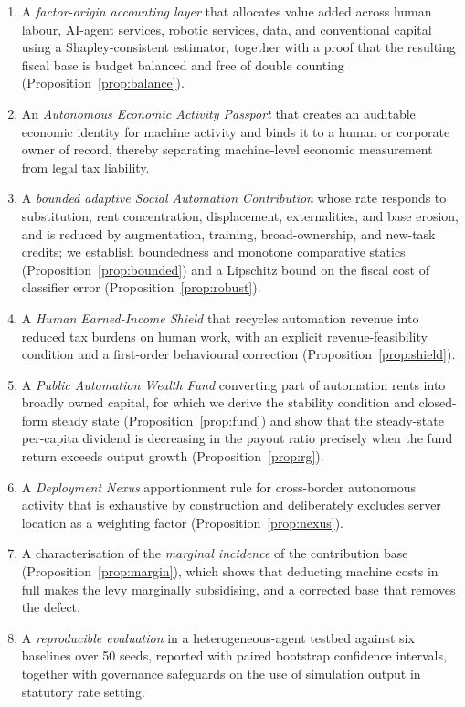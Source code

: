 \documentclass[journal]{IEEEtran}
\theoremstyle{plain}
\theoremstyle{definition}
\begin{document}
\begin{enumerate}
\item A \emph{factor-origin accounting layer} that allocates value added across human labour, AI-agent services, robotic services, data, and conventional capital using a Shapley-consistent estimator, together with a proof that the resulting fiscal base is budget balanced and free of double counting (Proposition~\ref{prop:balance}).
\item An \emph{Autonomous Economic Activity Passport} that creates an auditable economic identity for machine activity and binds it to a human or corporate owner of record, thereby separating machine-level economic measurement from legal tax liability.
\item A \emph{bounded adaptive Social Automation Contribution} whose rate responds to substitution, rent concentration, displacement, externalities, and base erosion, and is reduced by augmentation, training, broad-ownership, and new-task credits; we establish boundedness and monotone comparative statics (Proposition~\ref{prop:bounded}) and a Lipschitz bound on the fiscal cost of classifier error (Proposition~\ref{prop:robust}).
\item A \emph{Human Earned-Income Shield} that recycles automation revenue into reduced tax burdens on human work, with an explicit revenue-feasibility condition and a first-order behavioural correction (Proposition~\ref{prop:shield}).
\item A \emph{Public Automation Wealth Fund} converting part of automation rents into broadly owned capital, for which we derive the stability condition and closed-form steady state (Proposition~\ref{prop:fund}) and show that the steady-state per-capita dividend is decreasing in the payout ratio precisely when the fund return exceeds output growth (Proposition~\ref{prop:rg}).
\item A \emph{Deployment Nexus} apportionment rule for cross-border autonomous activity that is exhaustive by construction and deliberately excludes server location as a weighting factor (Proposition~\ref{prop:nexus}).
\item A characterisation of the \emph{marginal incidence} of the contribution base (Proposition~\ref{prop:margin}), which shows that deducting machine costs in full makes the levy marginally subsidising, and a corrected base that removes the defect.

\item A \emph{reproducible evaluation} in a heterogeneous-agent testbed against six baselines over 50 seeds, reported with paired bootstrap confidence intervals, together with governance safeguards on the use of simulation output in statutory rate setting.
\end{enumerate}
\end{document}
